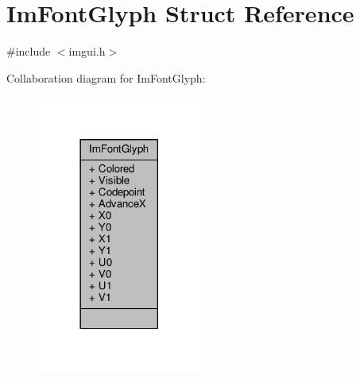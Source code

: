 \hypertarget{structImFontGlyph}{}\section{Im\+Font\+Glyph Struct Reference}
\label{structImFontGlyph}


{\ttfamily \#include $<$imgui.\+h$>$}



Collaboration diagram for Im\+Font\+Glyph\+:
\nopagebreak
\begin{figure}[H]
\begin{center}
\leavevmode
\includegraphics[width=153pt]{structImFontGlyph__coll__graph}
\end{center}
\end{figure}
